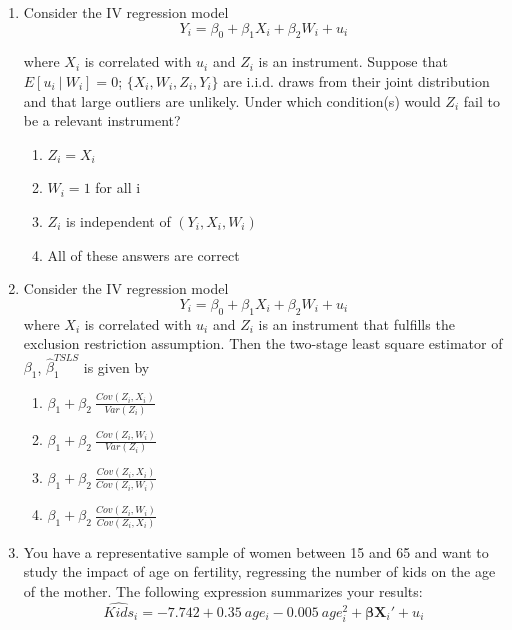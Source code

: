 \documentclass{article}
\begin{document}
\begin{enumerate}
\item Consider the IV regression model
\begin{equation*}
    Y_i = \beta_0 + \beta_1 X_i + \beta_2 W_i + u_i
\end{equation*}

where $X_i$ is correlated with $u_i$ and $Z_i$ is an instrument. Suppose that $E[u_i~\vert~ W_{i}] = 0$; $\{X_{i}, W_{i}, Z_{i}, Y_i\}$ are i.i.d. draws from their joint
distribution and that large outliers are unlikely. Under which condition(s) would $Z_i$ fail to be a relevant instrument?

\begin{enumerate}[label=\alph*)]
\item $Z_i = X_i$
\item $W_i = 1$ for all i
\item $Z_i$ is independent of $(Y_i, X_i, W_i)$
\item All of these answers are correct
\end{enumerate}\vspace{.25cm}



\item Consider the IV regression model
\begin{equation*}
    Y_i = \beta_0 + \beta_1 X_i + \beta_2 W_i + u_i
\end{equation*}
where $X_i$ is correlated with $u_i$ and $Z_i$ is an instrument that fulfills the exclusion restriction assumption. Then the two-stage least square estimator of $\beta_1$, $\hat{\beta}_1^{TSLS}$ is given by
\begin{enumerate}[label=\alph*)]
\item $\beta_1+\beta_2~\frac{Cov(Z_i, X_i)}{Var(Z_i)}$
\item $\beta_1+\beta_2~\frac{Cov(Z_i, W_i)}{Var(Z_i)}$ 
\item $\beta_1+\beta_2~\frac{Cov(Z_i, X_i)}{Cov(Z_i, W_i)}$
\item $\beta_1+\beta_2~\frac{Cov(Z_i, W_i)}{Cov(Z_i, X_i)}$ 
\end{enumerate}\vspace{.25cm}


\item You have a representative sample of women between 15 and 65 and want to study the impact of age on fertility, regressing the number of kids on the age of the mother. The following expression summarizes your results:
\begin{equation*}
    \widehat{Kids}_i = -7.742 + 0.35~age_i - 0.005~age_i^2 + \mathbf{\beta}\textbf{X}_{i}' + u_i
\end{equation*}


\end{enumerate}
\end{document}
